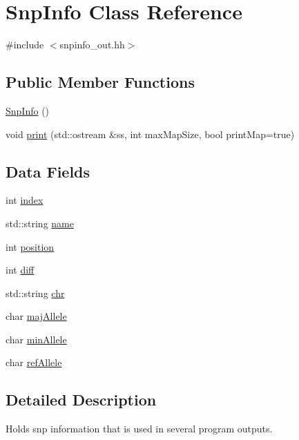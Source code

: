 \hypertarget{classSnpInfo}{
\section{SnpInfo Class Reference}
\label{classSnpInfo}
}


{\ttfamily \#include $<$snpinfo\_\-out.hh$>$}

\subsection*{Public Member Functions}
\begin{DoxyCompactItemize}
\item 
\hyperlink{classSnpInfo_a65b651b47027f6f55b082b063a183471}{SnpInfo} ()
\item 
void \hyperlink{classSnpInfo_aadc0bad527f131f3294847b552241f32}{print} (std::ostream \&ss, int maxMapSize, bool printMap=true)
\end{DoxyCompactItemize}
\subsection*{Data Fields}
\begin{DoxyCompactItemize}
\item 
int \hyperlink{classSnpInfo_a9e340750436d460a79d14a3cca98d4c2}{index}
\item 
std::string \hyperlink{classSnpInfo_a0eda22dd7438af3aed0ff4a6ed66c5a2}{name}
\item 
int \hyperlink{classSnpInfo_a591c2bc650f6108b2e6ce0088ca1c8ca}{position}
\item 
int \hyperlink{classSnpInfo_a8703dc63736fd564b6d0f2f7c133fb51}{diff}
\item 
std::string \hyperlink{classSnpInfo_afa65e7acd26e25091182b52b2d8fdeab}{chr}
\item 
char \hyperlink{classSnpInfo_a81ef1a04ce03dbcbd357081f2f9da5bc}{majAllele}
\item 
char \hyperlink{classSnpInfo_a9dbfcbe8817b01358436533774b1d36b}{minAllele}
\item 
char \hyperlink{classSnpInfo_a7bb6397cd3bbc9461b0b2bf5390bf2b1}{refAllele}
\end{DoxyCompactItemize}


\subsection{Detailed Description}
Holds snp information that is used in several program outputs. 


